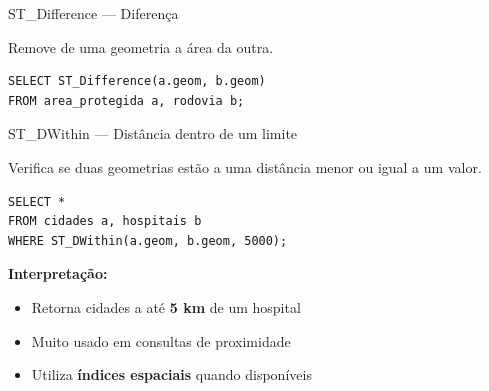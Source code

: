 \documentclass{beamer}
\begin{document}
\begin{frame}[fragile]{ST\_Difference — Diferença}
    
    Remove de uma geometria a área da outra.
    
    \begin{verbatim}
SELECT ST_Difference(a.geom, b.geom)
FROM area_protegida a, rodovia b;
    \end{verbatim}
    
    \begin{center}
    \end{center}
    
\end{frame}

\begin{frame}[fragile]{ST\_DWithin — Distância dentro de um limite}
    
    Verifica se duas geometrias estão a uma distância menor ou igual a um valor.
    
    \begin{verbatim}
SELECT *
FROM cidades a, hospitais b
WHERE ST_DWithin(a.geom, b.geom, 5000);
    \end{verbatim}
    
    \vspace{0.3cm}
    
    \textbf{Interpretação:}
    \begin{itemize}
        \item Retorna cidades a até \textbf{5 km} de um hospital
        \item Muito usado em consultas de proximidade
        \item Utiliza \textbf{índices espaciais} quando disponíveis
    \end{itemize}
    
    \begin{center}
    \end{center}
    
\end{frame}
\end{document}
